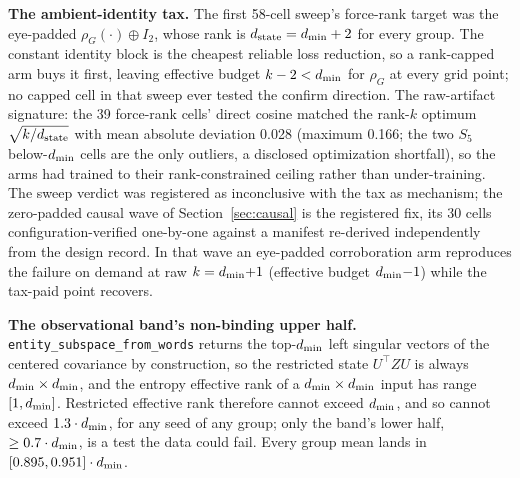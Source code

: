 \textbf{The ambient-identity tax.} The first 58-cell sweep's force-rank
target was the eye-padded $\rho_G(\cdot) \oplus I_2$, whose rank is
$d_{\mathrm{state}} = d_{\min} + 2$ for every group.
The constant identity block is
the cheapest reliable loss reduction, so a rank-capped arm buys it
first, leaving effective budget $k - 2 < d_{\min}$ for $\rho_G$ at every
grid point; no capped cell in that sweep ever tested the confirm
direction. The raw-artifact signature: the 39 force-rank cells' direct
cosine matched the rank-$k$ optimum $\sqrt{k/d_{\mathrm{state}}}$ with mean
absolute deviation 0.028 (maximum 0.166; the two $S_5$ below-$d_{\min}$
cells are the only outliers, a disclosed optimization shortfall), so the
arms had trained to their rank-constrained ceiling rather than
under-training.
The sweep verdict was registered as inconclusive with the tax as
mechanism; the zero-padded causal wave of Section~\ref{sec:causal} is
the registered fix, its 30 cells configuration-verified one-by-one
against a manifest re-derived independently from the design record. In
that wave an eye-padded corroboration arm reproduces the failure on
demand at raw $k = d_{\min}{+}1$ (effective budget $d_{\min}{-}1$) while the
tax-paid point recovers.

\textbf{The observational band's non-binding upper half.}
\texttt{entity\_subspace\_from\_words} returns the top-$d_{\min}$ left
singular vectors of the centered covariance by construction, so the
restricted state $U^{\top} Z U$ is always $d_{\min} \times d_{\min}$, and the
entropy effective rank of a $d_{\min} \times d_{\min}$ input has range
$[1, d_{\min}]$. Restricted effective rank therefore cannot exceed $d_{\min}$,
and so cannot exceed $1.3 \cdot d_{\min}$, for any seed of any group; only
the band's lower half, $\geq 0.7 \cdot d_{\min}$, is a test the data could
fail. Every group mean lands in $[0.895, 0.951] \cdot d_{\min}$.

